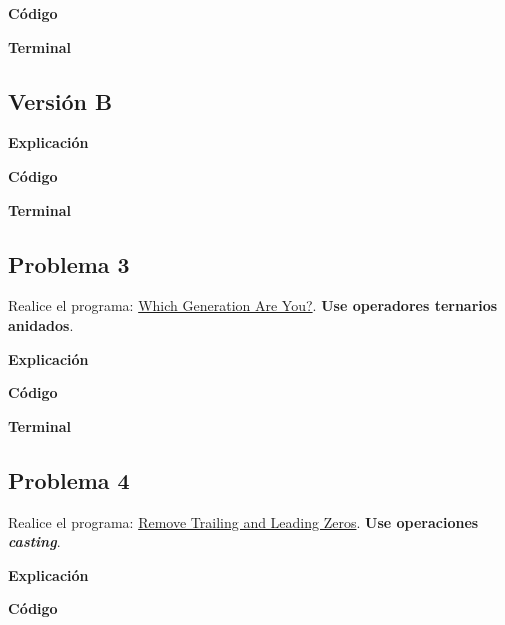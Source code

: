 \documentclass[11pt, twocolumn]{article}
\begin{document}
  \textbf{Código}

  
  \textbf{Terminal}

  \subsection*{Versión B}

  \textbf{Explicación} 

  \textbf{Código}

  
  \textbf{Terminal}

  \subsection*{Problema 3}
  Realice el programa:  \href{https://edabit.com/challenge/48EJWLhF224na8po3}{Which Generation Are You?}. \textbf{Use operadores ternarios anidados}.

  \textbf{Explicación} 
  

  \textbf{Código}


  \textbf{Terminal}

  \subsection*{Problema 4}
  Realice el programa:  \href{https://edabit.com/challenge/7CWbYfRji9yhna9tf}{Remove Trailing and Leading Zeros}. \textbf{Use operaciones \textit{casting}}.

  \textbf{Explicación} 
  

  \textbf{Código}
\end{document}
